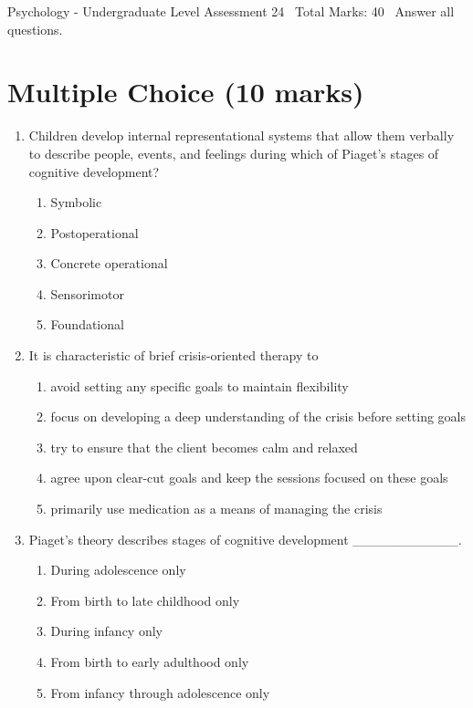 \documentclass[12pt]{article}
\begin{document}
\begin{center}
Psychology - Undergraduate Level Assessment 24 \
Total Marks: 40 \
Answer all questions.
\end{center}

\section*{Multiple Choice (10 marks)}
\begin{enumerate}[label=\arabic*.]
\item Children develop internal representational systems that allow them verbally to describe people, events, and feelings during which of Piaget's stages of cognitive development?
\begin{enumerate}[label=(\alph*)]
    \item Symbolic
    \item Postoperational
    \item Concrete operational
    \item Sensorimotor
    \item Foundational
\end{enumerate}
\item It is characteristic of brief crisis-oriented therapy to
\begin{enumerate}[label=(\alph*)]
    \item avoid setting any specific goals to maintain flexibility
    \item focus on developing a deep understanding of the crisis before setting goals
    \item try to ensure that the client becomes calm and relaxed
    \item agree upon clear-cut goals and keep the sessions focused on these goals
    \item primarily use medication as a means of managing the crisis
\end{enumerate}
\item Piaget's theory describes stages of cognitive development \_\_\_\_\_\_\_\_\_\_\_.
\begin{enumerate}[label=(\alph*)]
    \item During adolescence only
    \item From birth to late childhood only
    \item During infancy only
    \item From birth to early adulthood only
    \item From infancy through adolescence only
\end{enumerate}

\end{enumerate}
\end{document}
